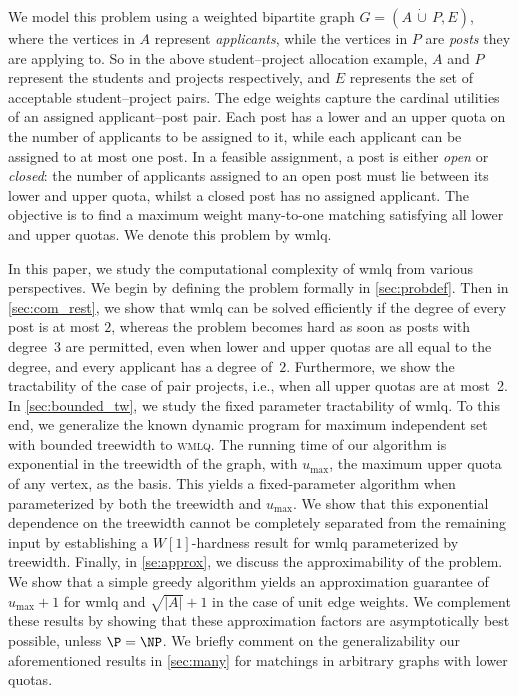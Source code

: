 \documentclass{llncs}
\begin{document}
We model this problem using a weighted bipartite graph $G= (A\,\dot\cup\,P, E)$, where the vertices in $A$ represent \emph{applicants}, while the vertices in $P$ are \emph{posts} they are applying to. So in the above student--project allocation example, $A$ and $P$ represent the students and projects respectively, and $E$ represents the set of acceptable student--project pairs. The edge weights capture the cardinal utilities of an assigned applicant--post pair. Each post has a lower and an upper quota on the number of applicants to be assigned to it, while each applicant can be assigned to at most one post.  In a feasible assignment, a post is either \emph{open} or \emph{closed}: the number of applicants assigned to an open post must lie between its lower and upper quota, whilst a closed post has no assigned applicant. The objective is to find a maximum weight many-to-one matching satisfying all lower and upper quotas. We denote this problem by {\sc wmlq}.

In this paper, we study the computational complexity of {\sc wmlq} from various perspectives.  We begin by defining the problem formally in \cref{sec:probdef}.  Then in \cref{sec:com_rest}, we show that {\sc wmlq} can be solved efficiently if the degree of every post is at most $2$, whereas the problem becomes hard as soon as posts with degree~$3$ are permitted, even when lower and upper quotas are all equal to the degree, and every applicant has a degree of~$2$. Furthermore, we show the tractability of the case of pair projects, i.e., when all upper quotas are at most~2. In \cref{sec:bounded_tw}, we study the fixed parameter tractability of {\sc wmlq}. To this end, we generalize the known dynamic program for maximum independent set with bounded treewidth to \textsc{wmlq}. The running time of our algorithm is exponential in the treewidth of the graph, with $u_{\max}$, the maximum upper quota of any vertex, as the basis. This yields a fixed-parameter algorithm when parameterized by both the treewidth and $u_{\max}$. We show that this exponential dependence on the treewidth cannot be completely separated from the remaining input by establishing a $W[1]$-hardness result for {\sc wmlq} parameterized by treewidth. Finally, in \cref{se:approx}, we discuss the approximability of the problem. We show that a simple greedy algorithm yields an approximation guarantee of $u_{\max}+1$ for {\sc wmlq} and $\sqrt{|A|}+1$ in the case of unit edge weights. We complement these results by showing that these approximation factors are asymptotically best possible, unless $\P = \NP$. We briefly comment on the generalizability our aforementioned results in \cref{sec:many} for matchings in arbitrary graphs with lower quotas.
\end{document}

